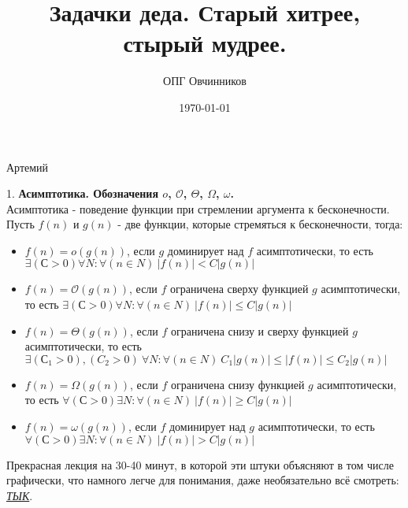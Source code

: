 \documentclass[12pt]{article}
\title{Задачки деда. Старый хитрее, стырый мудрее.}
\author{ОПГ Овчинников}
\date{\today}
\begin{document}
\maketitle
\large

\begin{center}
    Артемий
\end{center}

1. \textbf{Асимптотика. Обозначения $o$, $\mathcal{O}$, $\Theta$, $\Omega$, $\omega$.}\\
Асимптотика - поведение функции при стремлении аргумента к бесконечности.\\
Пусть $f(n)$ и $g(n)$ - две функции, которые стремяться к бесконечности, тогда:
\begin{itemize}
    \item $f(n) = o(g(n))$, если $g$ доминирует над $f$ асимптотически, то есть $\exists (С > 0) \forall N : \forall(n \in N)\ |f(n)| < C|g(n)|$
    \item $f(n) = \mathcal{O}(g(n))$, если $f$ ограничена сверху функцией $g$ асимптотически, то есть $\exists (С > 0) \forall N : \forall(n \in N)\ |f(n)| \leq C|g(n)|$
    \item $f(n) = \Theta(g(n))$, если $f$ ограничена снизу и сверху функцией 
    $g$ асимптотически, то есть $\exists (С_{1} > 0), (C_{2} > 0) \ \forall N : \forall(n \in N)\ C_{1}|g(n)| \leq |f(n)| \leq C_{2}|g(n)|$
    \item $f(n) = \Omega(g(n))$, если $f$ ограничена снизу функцией 
    $g$ асимптотически, то есть $\forall (С > 0) \exists N : \forall(n \in N)\ |f(n)| \geq C|g(n)|$
    \item $f(n) = \omega(g(n))$, если $f$ доминирует над $g$ асимптотически, то есть $\forall (С > 0) \exists N : \forall(n \in N)\ |f(n)| > C|g(n)|$
\end{itemize}

Прекрасная лекция на 30-40 минут, в которой эти штуки объясняют в том числе графически, что намного легче для понимания, даже необязательно всё смотреть: \href{https://www.youtube.com/watch?v=dpdimxKMMTc}{\textit{ТЫК}}.
\end{document}
